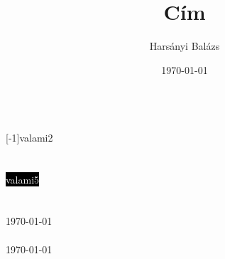 \documentclass{article}
\begin{document}
\\
\scalebox{2}[-1]{valami2}
\\
\\
\\
\textcolor{white}{\colorbox{black}{valami5}}
\\
\textcolor{red}{}
\\
\blindtext
\\
\today
\\
\hulipsum[1]
\\
\today
\\
\begin{otherlanguage}{latin}
\lipsum[1]
\end{otherlanguage}
\\
\clearpage
\title{Cím}
\author{Harsányi Balázs}
\date{\today}

\maketitle
\end{document}
